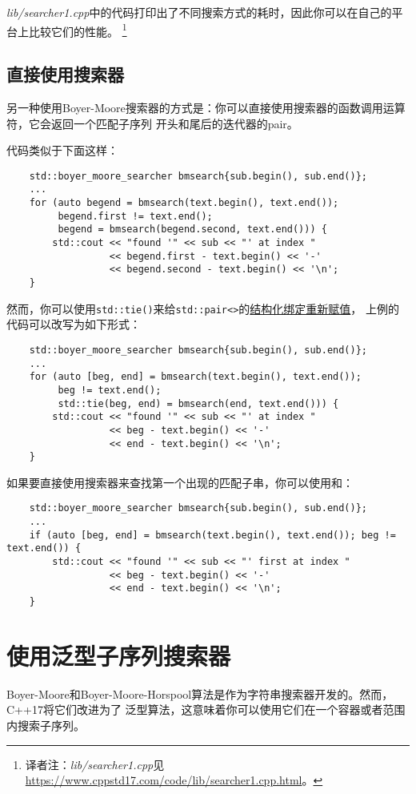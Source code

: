 \emph{lib/searcher1.cpp}中的代码打印出了不同搜索方式的耗时，因此你可以在自己的平台上比较它们的性能。
\footnote{译者注：\emph{lib/searcher1.cpp}见\url{https://www.cppstd17.com/code/lib/searcher1.cpp.html}。}

\subsection{直接使用搜索器}\label{ch24.1.2}
另一种使用Boyer-Moore搜索器的方式是：你可以直接使用搜索器的函数调用运算符，它会返回一个匹配子序列
开头和尾后的迭代器的pair。

代码类似于下面这样：
\begin{lstlisting}
    std::boyer_moore_searcher bmsearch{sub.begin(), sub.end()};
    ...
    for (auto begend = bmsearch(text.begin(), text.end());
         begend.first != text.end();
         begend = bmsearch(begend.second, text.end())) {
        std::cout << "found '" << sub << "' at index "
                  << begend.first - text.begin() << '-'
                  << begend.second - text.begin() << '\n';
    }
\end{lstlisting}
然而，你可以使用\texttt{std::tie()}来给\texttt{std::pair<>}的\hyperref[ch1.2.3.4]{结构化绑定重新赋值}，
上例的代码可以改写为如下形式：
\begin{lstlisting}
    std::boyer_moore_searcher bmsearch{sub.begin(), sub.end()};
    ...
    for (auto [beg, end] = bmsearch(text.begin(), text.end());
         beg != text.end();
         std::tie(beg, end) = bmsearch(end, text.end())) {
        std::cout << "found '" << sub << "' at index "
                  << beg - text.begin() << '-'
                  << end - text.begin() << '\n';
    }
\end{lstlisting}
如果要直接使用搜索器来查找第一个出现的匹配子串，你可以使用和：
\begin{lstlisting}
    std::boyer_moore_searcher bmsearch{sub.begin(), sub.end()};
    ...
    if (auto [beg, end] = bmsearch(text.begin(), text.end()); beg != text.end()) {
        std::cout << "found '" << sub << "' first at index "
                  << beg - text.begin() << '-'
                  << end - text.begin() << '\n';
    }
\end{lstlisting}


\section{使用泛型子序列搜索器}
Boyer-Moore和Boyer-Moore-Horspool算法是作为字符串搜索器开发的。然而，C++17将它们改进为了
泛型算法，这意味着你可以使用它们在一个容器或者范围内搜索子序列。

